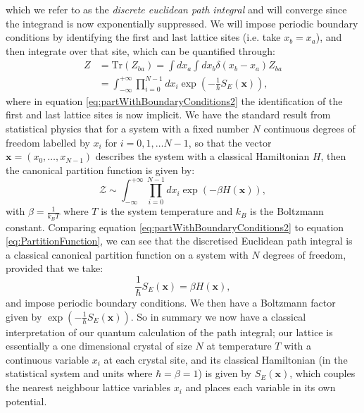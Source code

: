 \documentclass[12pt]{article}
\begin{document}
        which we refer to as the \textit{discrete euclidean path integral} and will converge since the integrand is now exponentially suppressed. We will impose periodic boundary conditions by identifying the first and last lattice sites (i.e. take $x_b=x_a$), and then integrate over that site, which can be quantified through: 
        \begin{align}
            \label{eq:partWithBoundaryConditions1}
            Z & = \text{Tr}\left(Z_{ba}\right) = \int dx_a \int dx_b \delta\left(x_b-x_a\right)Z_{ba} \\
            \label{eq:partWithBoundaryConditions2}
              & = \int^{+\infty}_{-\infty}\prod_{i=0}^{N-1}dx_i \exp{\left(-\frac{1}{\hbar}S_{E}\left(\bm{x}\right)\right)},
        \end{align}
        where in equation \ref{eq:partWithBoundaryConditions2} the identification of the first and last lattice sites is now implicit. We have the standard result from statistical physics that for a system with a fixed number $N$ continuous degrees of freedom labelled by $x_i$ for $i=0,1,\dots N-1$, so that the vector $\bm{x}=\left(x_0,\dots,x_{N-1}\right)$ describes the system with a classical Hamiltonian $H$, then the canonical partition function is given by:
        \begin{equation}
            \label{eq:PartitionFunction}
            \mathcal{Z} \sim \int_{-\infty}^{+\infty}\prod_{i=0}^{N-1}dx_{i}\exp{\left(-\beta H\left(\bm{x}\right)\right)},
        \end{equation}
        with $\beta=\frac{1}{k_{B}T}$ where $T$ is the system temperature and $k_{B}$ is the Boltzmann constant. Comparing equation \ref{eq:partWithBoundaryConditions2} to equation \ref{eq:PartitionFunction}, we can see that the discretised Euclidean path integral is a classical canonical partition function on a system with $N$ degrees of freedom, provided that we take:
        \begin{equation}
            \label{ActionToHamiltonian}
            \frac{1}{\hbar}S_{E}\left(\bm{x}\right) = \beta H\left(\bm{x}\right),
        \end{equation}
        and impose periodic boundary conditions. We then have a Boltzmann factor given by $\exp{\left(-\frac{1}{\hbar}S_{E}\left(\bm{x}\right)\right)}$. So in summary we now have a classical interpretation of our quantum calculation of the path integral; our lattice is essentially a one dimensional crystal of size $N$ at temperature $T$ with a continuous variable $x_i$ at each crystal site, and its classical Hamiltonian (in the statistical system and units where $\hbar=\beta=1$) is given by $S_E\left(\bm{x}\right)$, which couples the nearest neighbour lattice variables $x_i$ and places each variable in its own potential. 
\end{document}
